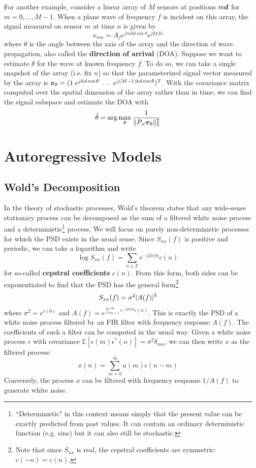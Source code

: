 \documentclass[twocolumn]{gwclass}
\newcommand{\Z}{\mathbb{Z}}
\begin{document}
For another example, consider a linear array of $M$ sensors at positions $m\boldsymbol{d}$ for $m=0,\dots, M-1$. When a plane wave of frequency $f$ is incident on this array, the signal measured on sensor $m$ at time $n$ is given by
$$ x_{mn} = A_fe^{jmkd\cos\theta} e^{j2\pi f n} $$
where $\theta$ is the angle between the axis of the array and the direction of wave propagation, also called the \textbf{direction of arrival} (DOA). Suppose we want to estimate $\theta$ for the wave at known frequency $f$. To do so, we can take a single snapshot of the array (i.e. fix $n$) so that the parameterized signal vector measured by the array is $ \boldsymbol{v}_\theta = (1\;e^{jkd\cos\theta}\;\dots\;e^{j(M-1)kd\cos\theta})^{\text{\normalfont{T}}}$. With the covariance matrix computed over the spatial dimension of the array rather than in time, we can find the signal subspace and estimate the DOA with
$$ \hat{\theta} = \arg\max_\theta \frac{1}{\|P_{\scriptscriptstyle\hat{\mathcal{N}}}\boldsymbol{v}_\theta\|_2^2} $$


\section{Autoregressive Models}
\subsection{Wold's Decomposition}
In the theory of stochastic processes, Wold's theorem states that any wide-sense stationary process can be decomposed as the sum of a filtered white noise process and a deterministic\footnote{``Deterministic" in this context means simply that the present value can be exactly predicted from past values. It can contain an ordinary deterministic function (e.g. sine) but it can also still be stochastic.} process. We will focus on purely non-deterministic processes for which the PSD exists in the usual sense. Since $S_{xx}(f)$ is positive and periodic, we can take a logarithm and write
$$ \log S_{xx}(f) = \sum_{n\in\Z} e^{-j2\pi f n} c(n)$$
for so-called \textbf{cepstral coefficients} $c(n)$. From this form, both sides can be exponentiated to find that the PSD has the general form\footnote{Note that since $S_{xx}$ is real, the cepstral coefficients are symmetric: $c(-n)=c(n)$.}
$$ S_{xx}(f) = \sigma^2 \abs{A(f)}^2$$
where $\sigma^2 = e^{c(0)}$ and $A(f) = e^{\sum_{n=1}^\infty e^{-j2\pi f n}c(n)}$. This is exactly the PSD of a white noise process filtered by an FIR filter with frequency response $A(f)$. The coefficients of such a filter can be computed in the usual way. Given a white noise process $\epsilon$ with covariance $\mathbb{E}[\epsilon(m)\epsilon^*(n)]=\sigma^2\delta_{mn}$, we can then write $x$ as the filtered process:
$$ x(n) = \sum_{m=0}^\infty a(m)\epsilon(n-m) $$
Conversely, the process $x$ can be filtered with frequency response $1/A(f)$ to generate white noise. 
\end{document}
